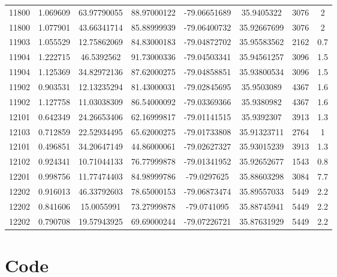 \documentclass[11pt]{article}
\begin{document}
\begin{longtable*}{|c|c|c|c|c|c|c|c|}
11800 & 1.069609       & 63.97790055       & 88.97000122    & -79.06651689 & 35.9405322  & 3076       & 2    \\
11800 & 1.077901       & 43.66341714       & 85.88999939    & -79.06400732 & 35.92667699 & 3076       & 2    \\
11903 & 1.055529       & 12.75862069       & 84.83000183    & -79.04872702 & 35.95583562 & 2162       & 0.7  \\
11904 & 1.222715       & 46.5392562        & 91.73000336    & -79.04503341 & 35.94561257 & 3096       & 1.5  \\
11904 & 1.125369       & 34.82972136       & 87.62000275    & -79.04858851 & 35.93800534 & 3096       & 1.5  \\
11902 & 0.903531       & 12.13235294       & 81.43000031    & -79.02845695 & 35.9503089  & 4367       & 1.6  \\
11902 & 1.127758       & 11.03038309       & 86.54000092    & -79.03369366 & 35.9380982  & 4367       & 1.6  \\
12101 & 0.642349       & 24.26653406       & 62.16999817    & -79.01141515 & 35.9392307  & 3913       & 1.3  \\
12103 & 0.712859       & 22.52934495       & 65.62000275    & -79.01733808 & 35.91323711 & 2764       & 1    \\
12101 & 0.496851       & 34.20647149       & 44.86000061    & -79.02627327 & 35.93015239 & 3913       & 1.3  \\
12102 & 0.924341       & 10.71044133       & 76.77999878    & -79.01341952 & 35.92652677 & 1543       & 0.8  \\
12201 & 0.998756       & 11.77474403       & 84.98999786    & -79.0297625  & 35.88603298 & 3084       & 7.7  \\
12202 & 0.916013       & 46.33792603       & 78.65000153    & -79.06873474 & 35.89557033 & 5449       & 2.2  \\
12202 & 0.841606       & 15.0055991        & 73.27999878    & -79.0741095  & 35.88745941 & 5449       & 2.2  \\
12202 & 0.790708       & 19.57943925       & 69.69000244    & -79.07226721 & 35.87631929 & 5449       & 2.2  \\
\hline
\end{longtable*}
\endgroup
\section{Code}
\inputminted[breaklines=True,fontsize=\tiny,python3=True,style=pastie]{Python}{source.py}
\end{document}
